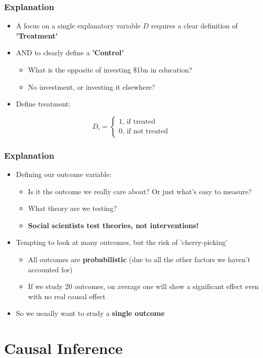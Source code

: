 \documentclass[xcolor=x11names,compress]{beamer}\usepackage[]{graphicx}\usepackage[]{color}
\renewcommand{\(}{\begin{columns}}
\renewcommand{\)}{\end{columns}}
\newcommand{\<}[1]{\begin{column}{#1}}
\renewcommand{\>}{\end{column}}
\begin{document}
\begin{frame}
\frametitle{Explanation}
\begin{itemize}
\item A focus on a single explanatory variable $D$ requires a clear definition of \textbf{'Treatment'}
\pause
\item AND to clearly define a \textbf{'Control'}
\pause
\begin{itemize}
\item What is the opposite of investing \$1bn in education?
\pause
\item No investment, or investing it elsewhere?
\pause
\end{itemize}
\item Define treatment:
\end{itemize}
\[D_i = 
\begin{cases}
1 \text{, if treated} \\
0 \text{, if not treated}
\end{cases}
\]
\end{frame}

\begin{frame}
\frametitle{Explanation}
\begin{itemize}
\item Defining our outcome variable:
\pause
\begin{itemize}
\item Is it the outcome we really care about? Or just what's easy to measure?
\pause
\item What theory are we testing?
\pause
\item \textbf{Social scientists test theories, not interventions!}
\end{itemize}
\pause
\item Tempting to look at many outcomes, but the risk of 'cherry-picking'
\pause
\begin{itemize}
\item All outcomes are \textbf{probabilistic} (due to all the other factors we haven't accounted for)
\pause
\item If we study 20 outcomes, on average one will show a significant effect even with no real causal effect
\pause
\end{itemize}
\item So we usually want to study a \textbf{single outcome}
\end{itemize}
\end{frame}


\section{Causal Inference}
\end{document}
